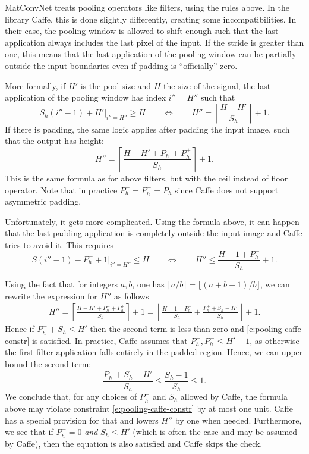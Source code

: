 MatConvNet treats pooling operators like filters, using the rules above. In the library Caffe, this is done slightly differently, creating some incompatibilities. In their case, the pooling window is allowed to shift enough such that the last application always includes the last pixel of the input. If the stride is greater than one, this means that the last application of the pooling window can be partially outside the input boundaries even if padding is ``officially'' zero.

More formally, if $H'$ is the pool size and $H$ the size of the signal, the last application of the pooling window has index $i'' = H''$ such that
\[
  S_h(i''-1) + H' \big|_{i''= H''} \geq H
  \qquad
  \Leftrightarrow
  \qquad
  H'' = \left\lceil 
  \frac{H - H'}{S_h}
  \right\rceil
  + 1.
\]
If there is padding, the same logic applies after padding the input image, such that the output has height:
\[
H'' = \left\lceil 
  \frac{H - H' + P_h^- + P_h^+}{S_h}
  \right\rceil
  + 1.
\]
This is the same formula as for above filters, but with the ceil instead of floor operator. Note that in practice $P_h^- = P_h^+ = P_h$ since Caffe does not support asymmetric padding. 

Unfortunately, it gets more complicated. Using the formula above, it can happen that the last padding application is completely outside the input image and Caffe tries to avoid it. This requires
\begin{equation}\label{e:pooling-caffe-constr}
  S(i'' - 1) - P_h^- + 1 \big|_{i''= H''} \leq H
  \qquad
  \Leftrightarrow
  \qquad
  H'' \leq \frac{H - 1 + P_h^-}{S_h} + 1.	
\end{equation}

Using the fact that for integers $a,b$, one has $\lceil a/b \rceil = \lfloor (a+b-1)/b \rfloor$, we can rewrite the expression for $H''$ as follows
\begin{align*}
H'' = \left\lceil 
  \frac{H - H' + P_h^- + P_h^+}{S_h}
  \right\rceil
  + 1
  =
  \left\lfloor
  \frac{H - 1 +P_h^-}{S_h}
  +
  \frac{P^+_h + S_h - H'}{S_h}
  \right\rfloor
  +1.
 \end{align*}
Hence if $P_h^+ +  S_h \leq H' $ then the second term is less than zero and \eqref{e:pooling-caffe-constr} is satisfied. In practice, Caffe assumes that $P_h^+, P_h^- \leq H' -1$, as otherwise the first filter application falls entirely in the padded region.  Hence, we can upper bound the second term:
\[
\frac{P^+_h + S_h - H'}{S_h}
\leq
\frac{S_h - 1}{S_h}
\leq
1.
\]
We conclude that, for any choices of $P_h^+$ and $S_h$ allowed by Caffe, the formula above may violate constraint \eqref{e:pooling-caffe-constr} by at most one unit. Caffe has a special provision for that and lowers $H''$ by one when needed. Furthermore, we see that if $P_h^+=0$ \emph{and} $S_h \leq H'$ (which is often the case and may be assumed by Caffe), then the equation is also satisfied and Caffe skips the check.

